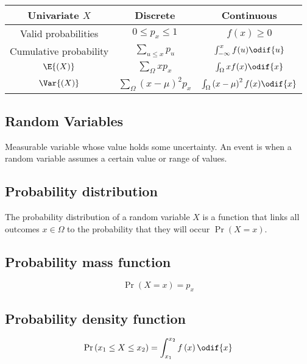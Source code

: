 \documentclass{article}
\begin{document}
\begin{minipage}{126.1962963mm}
    \begin{table}[H]
        \centering
        \begin{tabular}{c c c }
            \toprule
            \textbf{Univariate} \(X\)  & \textbf{Discrete}                              & \textbf{Continuous}                                    \\
            \midrule
            Valid probabilities        & \(0 \leq p_x \leq 1\)                          & \(f(x) \geq 0\)                                        \\
            Cumulative probability     & \(\sum_{u \leq x} p_u\)                        & \(\int_{-\infty}^{x} f(u) \odif{u}\)                   \\
            \(\E{\left( X \right)}\)   & \(\sum_{\Omega} xp_x\)                         & \(\int_{\Omega} xf(x)\odif{x}\)                        \\
            \(\Var{\left( X \right)}\) & \(\sum_{\Omega} \left( x - \mu \right)^2 p_x\) & \(\int_{\Omega} \left( x - \mu \right)^2f(x)\odif{x}\) \\
            \bottomrule
        \end{tabular}
    \end{table}
    \begin{multicols}{2}
        \section{Random Variables}
        Measurable variable whose value holds some uncertainty.
        An event is when a random variable assumes a certain value or range of values.
        \subsection{Probability distribution}
        The probability distribution of a random variable \(X\) is a function that links all outcomes \(x \in \Omega\)
        to the probability that they will occur \(\Pr{\left( X = x \right)}\).
        \subsection{Probability mass function}
        \begin{equation*}
            \Pr{\left( X = x \right)} = p_x
        \end{equation*}
        \subsection{Probability density function}
        \begin{equation*}
            \Pr{\left( x_1 \leq X \leq x_2 \right)} = \int_{x_1}^{x_2} f\left( x \right) \odif{x}
        \end{equation*}

\end{multicols}
\end{minipage}
\end{document}
